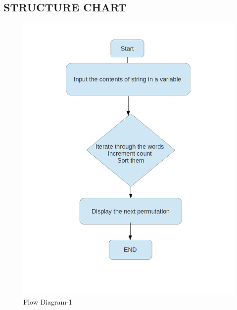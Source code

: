 \documentclass[11pt]{article}
\begin{document}
\begin{center}
\section{STRUCTURE CHART}
\end{center}
\bigskip
\begin{figure}[h]
\includegraphics[scale=0.4]{structure}
\centering
\caption{Flow Diagram-1}
\end{figure}
\end{document}
